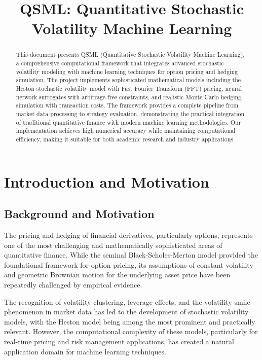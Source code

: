 \documentclass[12pt,a4paper]{article}
\title{\textbf{QSML: Quantitative Stochastic Volatility Machine Learning} \\

}
\begin{document}
\maketitle

\begin{abstract}
This document presents QSML (Quantitative Stochastic Volatility Machine Learning), a comprehensive computational framework that integrates advanced stochastic volatility modeling with machine learning techniques for option pricing and hedging simulation. The project implements sophisticated mathematical models including the Heston stochastic volatility model with Fast Fourier Transform (FFT) pricing, neural network surrogates with arbitrage-free constraints, and realistic Monte Carlo hedging simulation with transaction costs. The framework provides a complete pipeline from market data processing to strategy evaluation, demonstrating the practical integration of traditional quantitative finance with modern machine learning methodologies. Our implementation achieves high numerical accuracy while maintaining computational efficiency, making it suitable for both academic research and industry applications.
\end{abstract}

\tableofcontents
\newpage

\section{Introduction and Motivation}

\subsection{Background and Motivation}

The pricing and hedging of financial derivatives, particularly options, represents one of the most challenging and mathematically sophisticated areas of quantitative finance. While the seminal Black-Scholes-Merton model \citep{black1973pricing, merton1973theory} provided the foundational framework for option pricing, its assumptions of constant volatility and geometric Brownian motion for the underlying asset price have been repeatedly challenged by empirical evidence.

The recognition of volatility clustering, leverage effects, and the volatility smile phenomenon in market data has led to the development of stochastic volatility models, with the Heston model \citep{heston1993closed} being among the most prominent and practically relevant. However, the computational complexity of these models, particularly for real-time pricing and risk management applications, has created a natural application domain for machine learning techniques.
\end{document}
